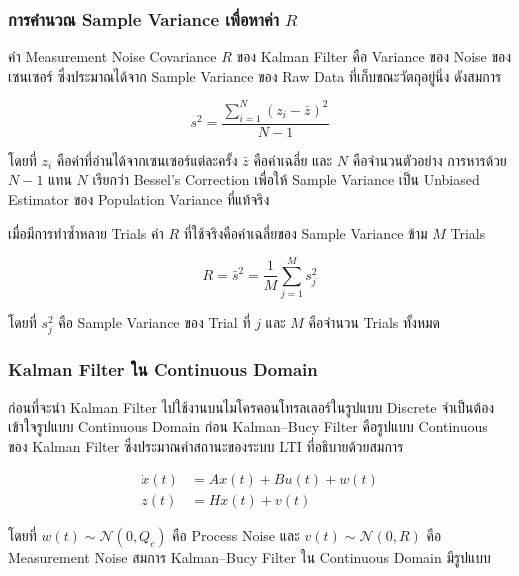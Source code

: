 \subsubsection{การคำนวณ Sample Variance เพื่อหาค่า $R$}

ค่า Measurement Noise Covariance $R$ ของ Kalman Filter คือ Variance
ของ Noise ของเซนเซอร์ ซึ่งประมาณได้จาก Sample Variance ของ Raw Data
ที่เก็บขณะวัตถุอยู่นิ่ง ดังสมการ

\begin{equation}
    s^2 = \frac{\displaystyle\sum_{i=1}^{N}(z_i - \bar{z})^2}{N - 1}
    \label{eq:exp2_sample_variance}
\end{equation}

โดยที่ $z_i$ คือค่าที่อ่านได้จากเซนเซอร์แต่ละครั้ง $\bar{z}$ คือค่าเฉลี่ย
และ $N$ คือจำนวนตัวอย่าง การหารด้วย $N-1$ แทน $N$ เรียกว่า
Bessel's Correction เพื่อให้ Sample Variance เป็น Unbiased Estimator
ของ Population Variance ที่แท้จริง

เมื่อมีการทำซ้ำหลาย Trials ค่า $R$ ที่ใช้จริงคือค่าเฉลี่ยของ
Sample Variance ข้าม $M$ Trials

\begin{equation}
    R = \bar{s}^2 = \frac{1}{M} \sum_{j=1}^{M} s_j^2
    \label{eq:exp2_mean_variance}
\end{equation}

โดยที่ $s_j^2$ คือ Sample Variance ของ Trial ที่ $j$
และ $M$ คือจำนวน Trials ทั้งหมด

\subsubsection{Kalman Filter ใน Continuous Domain}

ก่อนที่จะนำ Kalman Filter ไปใช้งานบนไมโครคอนโทรลเลอร์ในรูปแบบ Discrete
จำเป็นต้องเข้าใจรูปแบบ Continuous Domain ก่อน
Kalman--Bucy Filter คือรูปแบบ Continuous ของ Kalman Filter
ซึ่งประมาณค่าสถานะของระบบ LTI ที่อธิบายด้วยสมการ

\begin{align}
    \dot{x}(t) &= Ax(t) + Bu(t) + w(t) \label{eq:ct_state} \\
    z(t)        &= Hx(t) + v(t)          \label{eq:ct_obs}
\end{align}

โดยที่ $w(t) \sim \mathcal{N}(0, Q_c)$ คือ Process Noise
และ $v(t) \sim \mathcal{N}(0, R)$ คือ Measurement Noise
สมการ Kalman--Bucy Filter ใน Continuous Domain มีรูปแบบ

